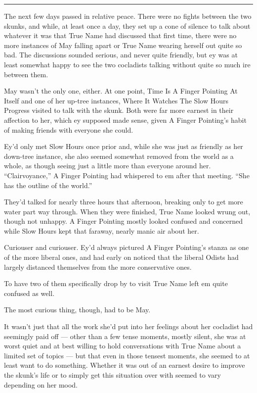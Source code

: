 \begin{center}\rule{0.5\linewidth}{0.5pt}\end{center}

The next few days passed in relative peace. There were no fights between the two skunks, and while, at least once a day, they set up a cone of silence to talk about whatever it was that True Name had discussed that first time, there were no more instances of May falling apart or True Name wearing herself out quite so bad. The discussions sounded serious, and never quite friendly, but ey was at least somewhat happy to see the two cocladists talking without quite so much ire between them.

May wasn't the only one, either. At one point, Time Is A Finger Pointing At Itself and one of her up-tree instances, Where It Watches The Slow Hours Progress visited to talk with the skunk. Both were far more earnest in their affection to her, which ey supposed made sense, given A Finger Pointing's habit of making friends with everyone she could.

Ey'd only met Slow Hours once prior and, while she was just as friendly as her down-tree instance, she also seemed somewhat removed from the world as a whole, as though seeing just a little more than everyone around her. ``Clairvoyance,'' A Finger Pointing had whispered to em after that meeting. ``She has the outline of the world.''

They'd talked for nearly three hours that afternoon, breaking only to get more water part way through. When they were finished, True Name looked wrung out, though not unhappy. A Finger Pointing mostly looked confused and concerned while Slow Hours kept that faraway, nearly manic air about her.

Curiouser and curiouser. Ey'd always pictured A Finger Pointing's stanza as one of the more liberal ones, and had early on noticed that the liberal Odists had largely distanced themselves from the more conservative ones.

To have two of them specifically drop by to visit True Name left em quite confused as well.

The most curious thing, though, had to be May.

It wasn't just that all the work she'd put into her feelings about her cocladist had seemingly paid off — other than a few tense moments, mostly silent, she was at worst quiet and at best willing to hold conversations with True Name about a limited set of topics — but that even in those tensest moments, she seemed to at least want to do something. Whether it was out of an earnest desire to improve the skunk's life or to simply get this situation over with seemed to vary depending on her mood.

